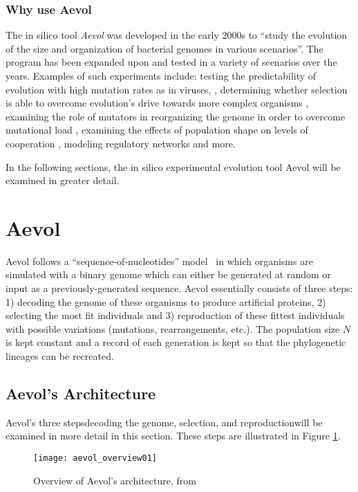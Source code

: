 \subsubsection{Why use Aevol}
The in silico tool \textit{Aevol} was developed in the early 2000s to ``study the evolution of the size and organization of bacterial genomes in various scenarios''\cite{Batut.2013}. The program has been expanded upon and tested in a variety of scenarios over the years. Examples of such experiments include: testing the predictability of evolution with high mutation rates as in viruses, \cite{beslon:hal-01577115}, determining whether selection is able to overcome evolution's drive towards more complex organisms \cite{doi:10.1162}, examining the role of mutators in reorganizing the genome in order to overcome mutational load \cite{doi:10.1186/s12862-019-1507-z}, examining the effects of population shape on levels of cooperation \cite{doi:10.1162/978-0-262-33936-0-ch057}, modeling regulatory networks \cite{sanchezdehesa:hal-01502737} and more. 
 
In the following sections, the in silico experimental evolution tool Aevol will be examined in greater detail. 

\section{Aevol}
Aevol follows a ``sequence-of-nucleotides'' model~\cite{Hindre.2012} in which organisms are simulated with a binary genome which can either be generated at random or input as a previously-generated sequence. Aevol essentially consists of three steps: 1) decoding the genome of these organisms to produce artificial proteins, 2) selecting the most fit individuals and 3) reproduction of these fittest individuals with possible variations (mutations, rearrangements, etc.). The population size $N$ is kept constant and a record of each generation is kept so that the phylogenetic lineages can be recreated.

\subsection{Aevol's Architecture}
Aevol's three steps\textemdash decoding the genome, selection, and reproduction\textemdash will be examined in more detail in this section. These steps are illustrated in Figure \ref{fig:aevol_overview01}. 

\begin{figure}[H]
	\texttt{[image: aevol\_overview01]}
	\centering
	\caption[Overview of Aevol's architecture.]{Overview of Aevol's architecture, from \cite{Batut.2013}}
	\label{fig:aevol_overview01}
\end{figure}
